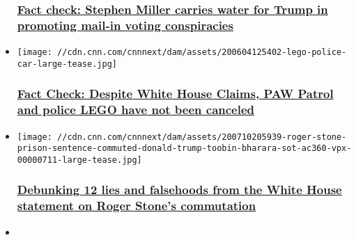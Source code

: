 \begin{itemize}
{  \subsubsection{\texorpdfstring{\href{/2020/07/31/politics/mail-voting-verification-stephen-miller-fact-check/index.html}{Fact
  check: Stephen Miller carries water for Trump in promoting mail-in
  voting
  conspiracies}}{Fact check: Stephen Miller carries water for Trump in promoting mail-in voting conspiracies}}\label{fact-check-stephen-miller-carries-water-for-trump-in-promoting-mail-in-voting-conspiracies}}
\item
  \href{/2020/07/24/politics/paw-patrol-lego-cancel-fact-check/index.html}{}

  \texttt{[image: //cdn.cnn.com/cnnnext/dam/assets/200604125402-lego-police-car-large-tease.jpg]}

  \hypertarget{fact-check-despite-white-house-claims-paw-patrol-and-police-lego-have-not-been-canceled}{%
  \subsubsection{\texorpdfstring{\href{/2020/07/24/politics/paw-patrol-lego-cancel-fact-check/index.html}{Fact
  Check: Despite White House Claims, PAW Patrol and police LEGO have not
  been
  canceled}}{Fact Check: Despite White House Claims, PAW Patrol and police LEGO have not been canceled}}\label{fact-check-despite-white-house-claims-paw-patrol-and-police-lego-have-not-been-canceled}}
\item
  \href{/2020/07/10/politics/fact-check-white-house-statement-roger-stone-commutation/index.html}{}

  \texttt{[image: //cdn.cnn.com/cnnnext/dam/assets/200710205939-roger-stone-prison-sentence-commuted-donald-trump-toobin-bharara-sot-ac360-vpx-00000711-large-tease.jpg]}

  \hypertarget{debunking-12-lies-and-falsehoods-from-the-white-house-statement-on-roger-stones-commutation-}{%
  \subsubsection{\texorpdfstring{\href{/2020/07/10/politics/fact-check-white-house-statement-roger-stone-commutation/index.html}{Debunking
  12 lies and falsehoods from the White House statement on Roger Stone's
  commutation
  }}{Debunking 12 lies and falsehoods from the White House statement on Roger Stone's commutation }}\label{debunking-12-lies-and-falsehoods-from-the-white-house-statement-on-roger-stones-commutation-}}
\item
  \href{/2020/07/08/politics/donald-trump-threat-to-cut-school-funding-fact-check/index.html}{}


\end{itemize}
